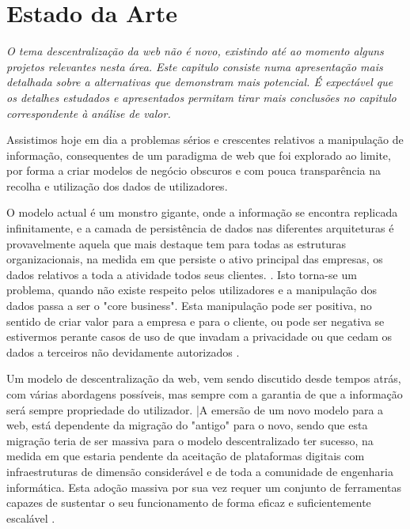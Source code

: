 \chapter{Estado da Arte}
\label{cap:2}
\emph{
O tema descentralização da web não é novo, existindo até ao momento alguns projetos relevantes nesta área.
Este capitulo consiste numa apresentação mais detalhada sobre a alternativas que demonstram mais potencial.
É expectável que os detalhes estudados e apresentados permitam tirar mais conclusões no capitulo correspondente à análise de valor. }

Assistimos hoje em dia a problemas sérios e crescentes relativos a manipulação de informação, consequentes de um paradigma de web que foi explorado ao limite, por forma a criar modelos de negócio obscuros e com pouca transparência na recolha e utilização dos dados de utilizadores.

O modelo actual é um monstro gigante, onde a informação se encontra replicada infinitamente, e a camada de persistência de dados nas diferentes arquiteturas é provavelmente aquela que mais destaque tem para todas as estruturas organizacionais, na medida em que persiste o ativo principal das empresas, os dados relativos a toda a atividade todos seus clientes. \cite{top_three_issues_centralized_web}. Isto torna-se um problema, quando não existe respeito pelos utilizadores e a manipulação dos dados passa a ser o "core business". Esta manipulação pode ser positiva, no sentido de criar valor para a empresa e para o cliente, ou pode ser negativa se estivermos perante casos de uso de que invadam a privacidade ou que cedam os dados a terceiros não devidamente autorizados \cite{facebook_data_hell_medium}.

Um modelo de descentralização da web, vem sendo discutido desde tempos atrás, com várias abordagens possíveis, mas sempre com a garantia de que a informação será sempre propriedade do utilizador. \cite{why_web_decentralization_future}
|A emersão de um novo modelo para a web, está dependente da migração do "antigo" para o novo, sendo que esta migração teria de ser massiva para o modelo descentralizado ter sucesso, na medida em que estaria pendente da aceitação de plataformas digitais com infraestruturas de dimensão considerável e de toda a comunidade de engenharia informática. Esta adoção massiva por sua vez requer um conjunto de ferramentas capazes de sustentar o seu funcionamento de forma eficaz e suficientemente escalável \cite{shift_power_to_users}.

